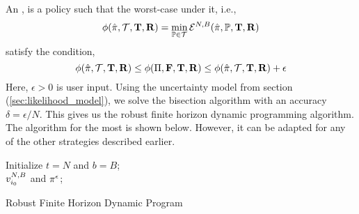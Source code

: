 An {\epsilonsuboptimal}, {\epsilonsuboptimalpolicy} is a policy such that the worst-case {\totalexpectedearnings} under it, i.e., 
\begin{equation}
\phi(\hat{\pi}, \mathcal{T}, {\mathbf{T}}, {\mathbf{R}}) = \min_{\mathbb{P} \in \mathcal{T}} \mathcal{E}^{N,B}(\hat{\pi}, \mathbb{P}, {\mathbf{T}}, {\mathbf{R}})
\end{equation}
satisfy the condition,
\begin{equation*}
\phi(\hat{\pi}, \mathcal{T}, {\mathbf{T}}, {\mathbf{R}}) \leq \phi(\Pi, {\mathbf{F}}, {\mathbf{T}}, {\mathbf{R}}) \leq \phi(\hat{\pi}, \mathcal{T}, {\mathbf{T}}, {\mathbf{R}}) + \epsilon
\end{equation*}
Here, $\epsilon > 0$ is user input. Using the uncertainty model from section (\ref{sec:likelihood_model}), we solve the bisection algorithm with an accuracy $\delta = \epsilon / N$. 
This gives us the robust finite horizon dynamic programming algorithm. The algorithm for the most {\relocationflexible} is shown below. However, it can be adapted for any of the other strategies described earlier.
\begin{algorithm}
\LinesNumbered
\KwIn{$\empiricaltransitionmatrix, \traveltimematrix, \rewardsmatrix, \epsilon, \beta$}

Initialize $t = N$ and $b = B$; \\
\Return $v_{{i_0}}^{N,B}$ and ${\pi}^{\epsilon}$;
\caption{Robust Finite Horizon Dynamic Program}
\label{alg:robust_dynamic_program}
\end{algorithm}
\fi



